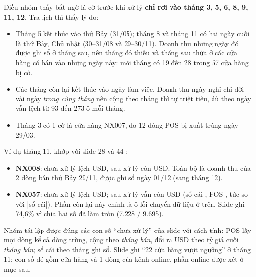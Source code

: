 \begin{table}[H]
\label{tab:cuahang}
\centering
{\small}
\end{table}

Điều nhóm thấy bất ngờ là cờ trước khi xử lý \textbf{chỉ rơi vào tháng 3, 5, 6, 8, 9, 11, 12}. Tra lịch thì thấy lý do:
\begin{itemize}
  \item Tháng 5 kết thúc vào thứ Bảy (31/05); tháng 8 và tháng 11 có hai ngày cuối là thứ Bảy, Chủ nhật (30--31/08 và 29--30/11). Doanh thu những ngày đó được ghi sổ ở tháng sau, nên tháng đó thiếu và tháng sau thừa ở các cửa hàng có bán vào những ngày này: mỗi tháng có 19 đến 28 trong 57 cửa hàng bị cờ.
  \item Các tháng còn lại kết thúc vào ngày làm việc. Doanh thu ngày nghỉ chỉ dời vài ngày \emph{trong cùng tháng} nên cộng theo tháng thì tự triệt tiêu, dù theo ngày vẫn lệch từ 93 đến 273 ô mỗi tháng.
  \item Tháng 3 có 1 cờ là cửa hàng NX007, do 12 dòng POS bị xuất trùng ngày 29/03.
\end{itemize}

Ví dụ tháng 11, khớp với slide 28 và 44 \cite{slide_project1}:
\begin{itemize}
  \item \textbf{NX008}: chưa xử lý lệch \SoNXKhongTamTruoc{} USD, sau xử lý còn \SoNXKhongTamSau{} USD. Toàn bộ là doanh thu của 2 dòng bán thứ Bảy 29/11, được ghi sổ ngày 01/12 (sang tháng 12).
  \item \textbf{NX057}: chưa xử lý lệch \SoNXNamBayTruoc{} USD; sau xử lý vẫn còn \SoNXNamBayLech{} USD (sổ cái \SoNXNamBaySoCai{}, POS \SoNXNamBayPOS{}, tức \SoNXNamBayPct{} so với |sổ cái|). Phần còn lại này chính là ô lỗi chuyển dữ liệu ở trên. Slide ghi $-$74,6\% vì chia hai số đã làm tròn (7.228 / 9.695).
\end{itemize}

Nhóm tái lập được đúng các con số ``chưa xử lý'' của slide với cách tính: POS lấy mọi dòng kể cả dòng trùng, cộng theo \emph{tháng bán}, đổi ra USD theo tỷ giá cuối \emph{tháng bán}; sổ cái theo tháng ghi sổ. Slide ghi ``22 cửa hàng vượt ngưỡng'' ở tháng 11: con số đó gồm \SoCHVuotTruocTMM{} cửa hàng và 1 dòng của kênh online, phần online được xét ở mục sau.

